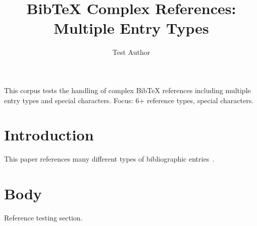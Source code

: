 \documentclass{article}
\title{BibTeX Complex References: Multiple Entry Types}
\author{Test Author}
\begin{document}
\maketitle

\begin{abstrct}
This corpus tests the handling of complex BibTeX references including multiple
entry types and special characters.
Focus: 6+ reference types, special characters.
\end{abstrct}

\section{Introduction}

This paper references many different types of bibliographic entries~\cite{article,book,conf,tech,thesis,manual,online,report,software,standard}.

\section{Body}

Reference testing section.



\end{document}
